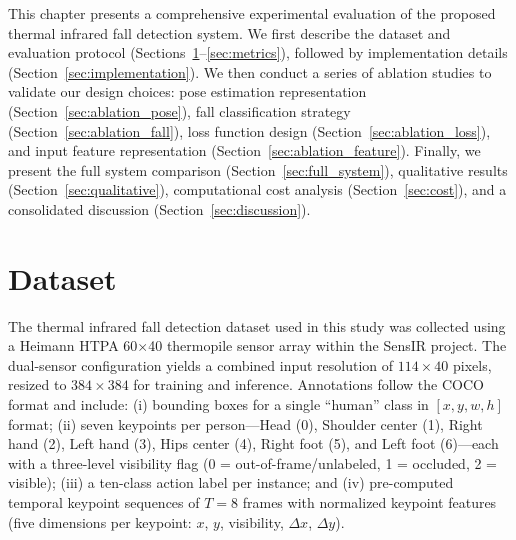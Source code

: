 \label{ch:experiments}

This chapter presents a comprehensive experimental evaluation of the proposed thermal infrared fall detection system. We first describe the dataset and evaluation protocol (Sections~\ref{sec:dataset}--\ref{sec:metrics}), followed by implementation details (Section~\ref{sec:implementation}). We then conduct a series of ablation studies to validate our design choices: pose estimation representation (Section~\ref{sec:ablation_pose}), fall classification strategy (Section~\ref{sec:ablation_fall}), loss function design (Section~\ref{sec:ablation_loss}), and input feature representation (Section~\ref{sec:ablation_feature}). Finally, we present the full system comparison (Section~\ref{sec:full_system}), qualitative results (Section~\ref{sec:qualitative}), computational cost analysis (Section~\ref{sec:cost}), and a consolidated discussion (Section~\ref{sec:discussion}).

\section{Dataset}
\label{sec:dataset}

The thermal infrared fall detection dataset used in this study was collected using a Heimann HTPA 60$\times$40 thermopile sensor array within the SensIR project. The dual-sensor configuration yields a combined input resolution of $114 \times 40$ pixels, resized to $384 \times 384$ for training and inference. Annotations follow the COCO format and include: (i) bounding boxes for a single ``human'' class in $[x, y, w, h]$ format; (ii) seven keypoints per person---Head (0), Shoulder center (1), Right hand (2), Left hand (3), Hips center (4), Right foot (5), and Left foot (6)---each with a three-level visibility flag (0 = out-of-frame/unlabeled, 1 = occluded, 2 = visible); (iii) a ten-class action label per instance; and (iv) pre-computed temporal keypoint sequences of $T = 8$ frames with normalized keypoint features (five dimensions per keypoint: $x$, $y$, visibility, $\Delta x$, $\Delta y$).

